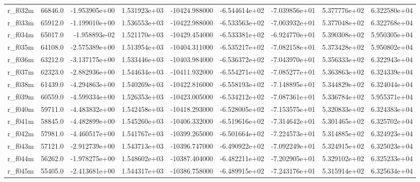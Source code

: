 \documentclass[10pt]{article}
\begin{document}
\begin{landscape}
\begin{longtable}{lrrrrrrrr}
r\_f032m                 &   66846.0 & -1.953905e+00 &  1.531923e+03 & -10424.988000 & -6.544614e+02 & -7.039856e+01 &  5.377776e+02 &  6.322580e+04 \\
r\_f033m                 &   65912.0 & -1.199010e+00 &  1.536553e+03 & -10422.988000 & -6.533563e+02 & -7.003932e+01 &  5.377048e+02 &  6.322768e+04 \\
r\_f034m                 &   65017.0 & -1.958893e-02 &  1.521170e+03 & -10429.454000 & -6.533381e+02 & -6.924770e+01 &  5.390308e+02 &  5.950305e+04 \\
r\_f035m                 &   64108.0 & -2.575389e+00 &  1.513954e+03 & -10404.311000 & -6.535217e+02 & -7.082158e+01 &  5.373428e+02 &  5.950802e+04 \\
r\_f036m                 &   63212.0 & -3.137175e+00 &  1.533446e+03 & -10403.984000 & -6.536372e+02 & -7.043970e+01 &  5.356333e+02 &  6.322943e+04 \\
r\_f037m                 &   62323.0 & -2.882936e+00 &  1.544634e+03 & -10411.932000 & -6.554271e+02 & -7.085277e+01 &  5.363863e+02 &  6.324339e+04 \\
r\_f038m                 &   61439.0 & -4.294863e+00 &  1.540269e+03 & -10422.816000 & -6.558193e+02 & -7.148895e+01 &  5.344829e+02 &  6.324044e+04 \\
r\_f039m                 &   60559.0 & -4.599334e+00 &  1.526353e+03 & -10423.005000 & -6.534212e+02 & -7.087361e+01 &  5.336784e+02 &  5.955371e+04 \\
r\_f040m                 &   59711.0 & -4.483832e+00 &  1.542458e+03 & -10418.293000 & -6.528005e+02 & -7.153575e+01 &  5.320833e+02 &  6.324383e+04 \\
r\_f041m                 &   58845.0 & -4.482899e+00 &  1.545260e+03 & -10406.332000 & -6.519616e+02 & -7.314642e+01 &  5.301465e+02 &  6.325702e+04 \\
r\_f042m                 &   57981.0 & -4.460517e+00 &  1.541767e+03 & -10399.265000 & -6.501664e+02 & -7.224573e+01 &  5.314885e+02 &  6.324923e+04 \\
r\_f043m                 &   57121.0 & -2.912739e+00 &  1.543713e+03 & -10396.747000 & -6.490922e+02 & -7.092249e+01 &  5.324915e+02 &  6.325023e+04 \\
r\_f044m                 &   56262.0 & -1.978275e+00 &  1.548602e+03 & -10387.404000 & -6.482211e+02 & -7.202905e+01 &  5.329102e+02 &  6.325233e+04 \\
r\_f045m                 &   55405.0 & -2.413681e+00 &  1.544317e+03 & -10386.758000 & -6.489915e+02 & -7.243176e+01 &  5.315914e+02 &  6.325634e+04 \\

\end{longtable}
\end{landscape}
\end{document}
